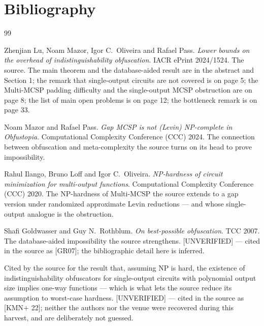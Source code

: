 \documentclass{conjura-conjecture}
\begin{document}
\section{Bibliography}

\begin{conjurabibliography}{99}

Zhenjian Lu, Noam Mazor, Igor C.\ Oliveira and Rafael Pass.
\emph{Lower bounds on the overhead of indistinguishability obfuscation}.
IACR ePrint 2024/1524.
The source. The main theorem and the database-aided result are in the
abstract and Section 1; the remark that single-output circuits are not
covered is on page 5; the Multi-MCSP padding difficulty and the
single-output MCSP obstruction are on page 8; the list of main open
problems is on page 12; the bottleneck remark is on page 33.

Noam Mazor and Rafael Pass.
\emph{Gap MCSP is not (Levin) NP-complete in Obfustopia}.
Computational Complexity Conference (CCC) 2024.
The connection between obfuscation and meta-complexity the source turns
on its head to prove impossibility.

Rahul Ilango, Bruno Loff and Igor C.\ Oliveira.
\emph{NP-hardness of circuit minimization for multi-output functions}.
Computational Complexity Conference (CCC) 2020.
The NP-hardness of Multi-MCSP the source extends to a gap version under
randomized approximate Levin reductions --- and whose single-output
analogue is the obstruction.

Shafi Goldwasser and Guy N.\ Rothblum.
\emph{On best-possible obfuscation}.
TCC 2007.
The database-aided impossibility the source strengthens. [UNVERIFIED] ---
cited in the source as [GR07]; the bibliographic detail here is inferred.

Cited by the source for the result that, assuming NP is hard, the
existence of indistinguishability obfuscators for single-output circuits
with polynomial output size implies one-way functions --- which is what lets
the source reduce its assumption to worst-case hardness. [UNVERIFIED] ---
cited in the source as [KMN+ 22]; neither the authors nor the venue were
recovered during this harvest, and are deliberately not guessed.

\end{conjurabibliography}
\end{document}
